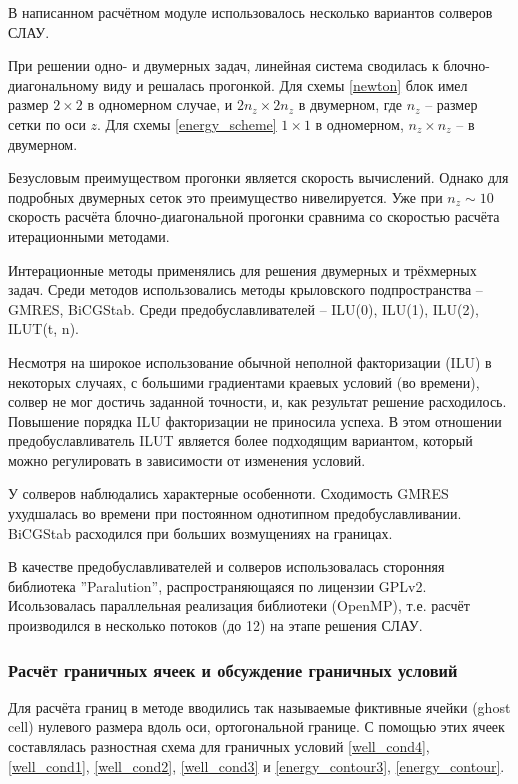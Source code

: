	В написанном расчётном модуле использовалось несколько вариантов солверов СЛАУ.

	При решении одно- и двумерных задач, линейная система сводилась к блочно-диагональному виду и решалась прогонкой.
	Для схемы \eqref{newton} блок имел размер $2\times2$ в одномерном случае, и $2n_z\times2n_z$ в двумерном, где $n_z$ -- размер сетки по оси $z$. Для схемы \eqref{energy_scheme} $1\times1$ в одномерном, $n_z\times n_z$ -- в двумерном.
	
	Безусловым преимуществом прогонки является скорость вычислений. Однако для подробных двумерных сеток это преимущество нивелируется. Уже при $n_z \sim 10$ скорость расчёта блочно-диагональной прогонки сравнима со скоростью расчёта итерационными методами.

	Интерационные методы применялись для решения двумерных и трёхмерных задач.
	Среди методов использовались методы крыловского подпространства -- GMRES, BiCGStab.
	Среди предобуславливателей -- ILU(0), ILU(1), ILU(2), ILUT(t, n).

	Несмотря на широкое использование обычной неполной факторизации (ILU) в некоторых случаях, с большими градиентами краевых условий (во времени), солвер не мог достичь заданной точности, и, как результат решение расходилось. Повышение порядка ILU факторизации не приносила успеха.
	В этом отношении предобуславливатель ILUT является более подходящим вариантом, который можно регулировать в зависимости от изменения условий.

	У солверов наблюдались характерные особенноти.
	Сходимость GMRES ухудшалась во времени при постоянном однотипном предобуславливании.
	BiCGStab расходился при больших возмущениях на границах.

	В качестве предобуславливателей и солверов использовалась сторонняя библиотека ''Paralution'', распространяющаяся по лицензии GPLv2. Исользовалась параллельная реализация библиотеки (OpenMP), т.е. расчёт производился в несколько потоков (до 12) на этапе решения СЛАУ.	

\subsubsection{Расчёт граничных ячеек и обсуждение граничных условий}
	Для расчёта границ в методе вводились так называемые фиктивные ячейки (ghost cell) нулевого размера вдоль оси, ортогональной границе. С помощью этих ячеек составлялась разностная схема для граничных условий \eqref{well_cond4}, \eqref{well_cond1}, \eqref{well_cond2}, \eqref{well_cond3} и \eqref{energy_contour3}, \eqref{energy_contour}.
	
